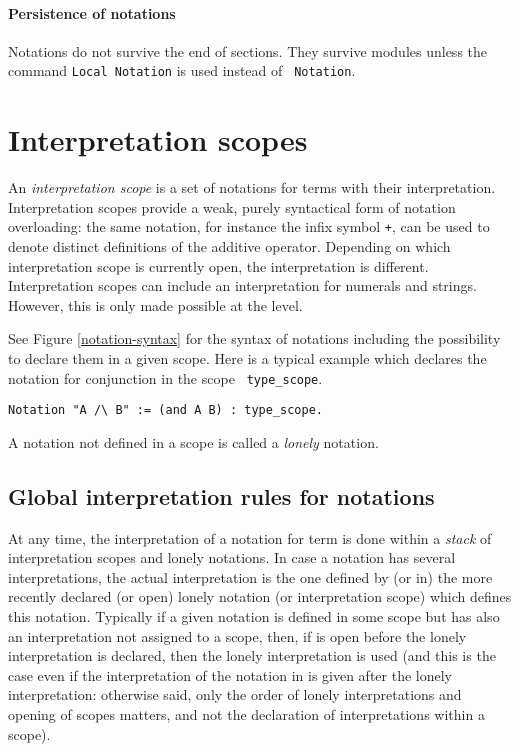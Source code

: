 \paragraph{Persistence of notations}

Notations do not survive the end of sections. They survive modules
unless the command {\tt Local Notation} is used instead of {\tt
Notation}.

\section[Interpretation scopes]{Interpretation scopes
\label{scopes}}

An {\em interpretation scope} is a set of notations for terms with
their interpretation. Interpretation scopes provide a weak,
purely syntactical form of notation overloading: the same notation, for
instance the infix symbol \verb=+=, can be used to denote distinct
definitions of the additive operator. Depending on which interpretation
scope is currently open, the interpretation is different.
Interpretation scopes can include an interpretation for
numerals and strings. However, this is only made possible at the
{\ocaml} level.

See Figure \ref{notation-syntax} for the syntax of notations including
the possibility to declare them in a given scope.  Here is a typical
example which declares the notation for conjunction in the scope {\tt
type\_scope}.

\begin{verbatim}
Notation "A /\ B" := (and A B) : type_scope.
\end{verbatim}

\Rem A notation not defined in a scope is called a {\em lonely} notation.

\subsection{Global interpretation rules for notations}

At any time, the interpretation of a notation for term is done within
a {\em stack} of interpretation scopes and lonely notations. In case a
notation has several interpretations, the actual interpretation is the
one defined by (or in) the more recently declared (or open) lonely
notation (or interpretation scope) which defines this notation.
Typically if a given notation is defined in some scope {\scope} but
has also an interpretation not assigned to a scope, then, if {\scope}
is open before the lonely interpretation is declared, then the lonely
interpretation is used (and this is the case even if the
interpretation of the notation in {\scope} is given after the lonely
interpretation: otherwise said, only the order of lonely
interpretations and opening of scopes matters, and not the declaration
of interpretations within a scope).

